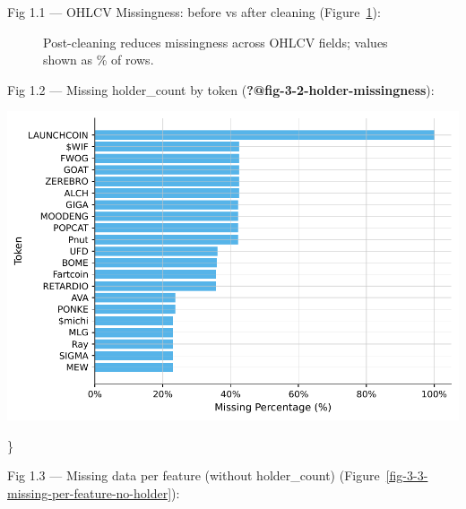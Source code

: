 \documentclass[
  a4paper,
  DIV=11,
  numbers=noendperiod]{scrreprt}
\begin{document}
Fig 1.1 --- OHLCV Missingness: before vs after cleaning
(Figure~\ref{fig-3-1-ohlcv-missingness}):

\begin{figure}


\caption{\label{fig-3-1-ohlcv-missingness}Post-cleaning reduces
missingness across OHLCV fields; values shown as \% of rows.}

\end{figure}%

Fig 1.2 --- Missing holder\_count by token
(\textbf{?@fig-3-2-holder-missingness}):

\begin{center}
\includegraphics[width=0.62\linewidth,height=\textheight,keepaspectratio]{appendices/figures/final/fig-3-2-holder-missingness.pdf}
\end{center}
\}

Fig 1.3 --- Missing data per feature (without holder\_count)
(Figure~\ref{fig-3-3-missing-per-feature-no-holder}):
\end{document}
